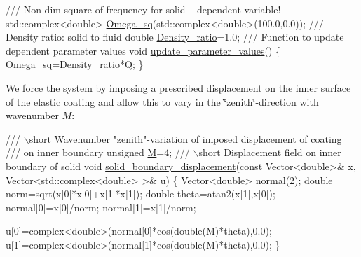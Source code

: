 \begin{DoxyCodeInclude}
\textcolor{comment}{}
\textcolor{comment}{ /// Non-dim square of frequency for solid -- dependent variable!}
\textcolor{comment}{} std::complex<double>  \hyperlink{namespaceGlobal__Parameters_a91314f7f1cc80c43543948568f50f405}{Omega\_sq}(std::complex<double>(100.0,0.0));
\textcolor{comment}{}
\textcolor{comment}{ /// Density ratio: solid to fluid}
\textcolor{comment}{} \textcolor{keywordtype}{double} \hyperlink{namespaceGlobal__Parameters_a517d4c31b8bce6563c2f605266dd9679}{Density\_ratio}=1.0; 
\textcolor{comment}{}
\textcolor{comment}{ /// Function to update dependent parameter values}
\textcolor{comment}{} \textcolor{keywordtype}{void} \hyperlink{namespaceGlobal__Parameters_ae0f9a80fb7510dbfbbef22582da231b7}{update\_parameter\_values}()
 \{
  \hyperlink{namespaceGlobal__Parameters_a91314f7f1cc80c43543948568f50f405}{Omega\_sq}=Density\_ratio*\hyperlink{namespaceGlobal__Parameters_a7814fddf663e56168174a42d2cd6b4c1}{Q};
 \}

\end{DoxyCodeInclude}


We force the system by imposing a prescribed displacement on the inner surface of the elastic coating and allow this to vary in the \char`\"{}zenith\char`\"{}-\/direction with wavenumber $ M $\+:


\begin{DoxyCodeInclude}
\textcolor{comment}{}
\textcolor{comment}{ /// \(\backslash\)short Wavenumber "zenith"-variation of imposed displacement of coating}
\textcolor{comment}{ /// on inner boundary }
\textcolor{comment}{} \textcolor{keywordtype}{unsigned} \hyperlink{namespaceGlobal__Parameters_abc67bb72ab99af013e3c7f6ffe453798}{M}=4; 
\textcolor{comment}{}
\textcolor{comment}{ /// \(\backslash\)short Displacement field on inner boundary of solid}
\textcolor{comment}{} \textcolor{keywordtype}{void} \hyperlink{namespaceGlobal__Parameters_ab51fa55d06d9963d363bcf966cfcc62b}{solid\_boundary\_displacement}(\textcolor{keyword}{const} Vector<double>& x,
                                  Vector<std::complex<double> >& u)
 \{
  Vector<double> normal(2);
  \textcolor{keywordtype}{double} norm=sqrt(x[0]*x[0]+x[1]*x[1]);
  \textcolor{keywordtype}{double} theta=atan2(x[1],x[0]);
  normal[0]=x[0]/norm;
  normal[1]=x[1]/norm;

  u[0]=complex<double>(normal[0]*cos(\textcolor{keywordtype}{double}(M)*theta),0.0);
  u[1]=complex<double>(normal[1]*cos(\textcolor{keywordtype}{double}(M)*theta),0.0);
 \}

\end{DoxyCodeInclude}


